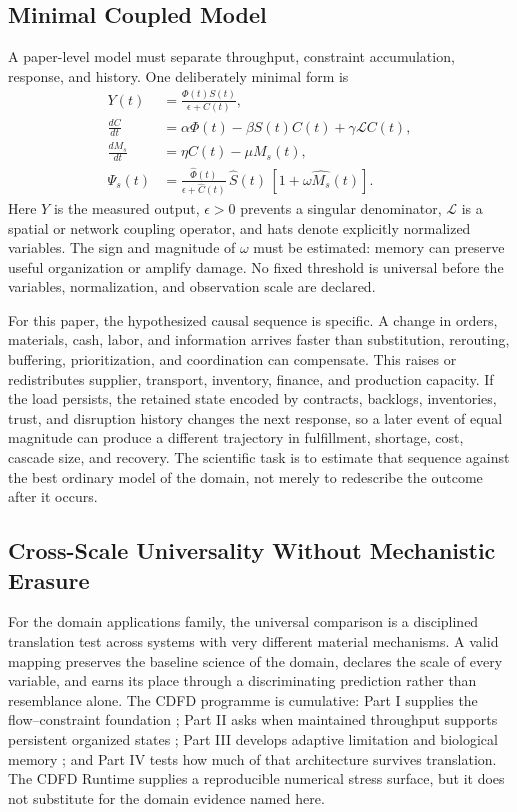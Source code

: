 \documentclass[11pt]{article}
\begin{document}
\subsection{Minimal Coupled Model}

A paper-level model must separate throughput, constraint accumulation, response,
and history. One deliberately minimal form is
\begin{align}
Y(t) &= \frac{\Phi(t)S(t)}{\epsilon + C(t)}, \\
\frac{dC}{dt} &= \alpha \Phi(t) - \beta S(t)C(t) + \gamma \mathcal{L}C(t), \\
\frac{dM_s}{dt} &= \eta C(t) - \mu M_s(t), \\
\Psi_s(t) &= \frac{\widehat{\Phi}(t)}{\epsilon+\widehat{C}(t)}\,
             \widehat{S}(t)\,[1+\omega\widehat{M_s}(t)] .
\end{align}
Here $Y$ is the measured output, $\epsilon>0$ prevents a singular denominator,
$\mathcal{L}$ is a spatial or network coupling operator, and hats denote
explicitly normalized variables. The sign and magnitude of $\omega$ must be
estimated: memory can preserve useful organization or amplify damage. No fixed
threshold is universal before the variables, normalization, and observation
scale are declared.

For this paper, the hypothesized causal sequence is specific. A change in
orders, materials, cash, labor, and information arrives faster than substitution, rerouting, buffering, prioritization, and coordination can compensate.
This raises or redistributes supplier, transport, inventory, finance, and production capacity. If the load persists,
the retained state encoded by contracts, backlogs, inventories, trust, and disruption history changes the next response, so a later event of equal
magnitude can produce a different trajectory in fulfillment, shortage, cost, cascade size, and recovery. The
scientific task is to estimate that sequence against the best ordinary model of
the domain, not merely to redescribe the outcome after it occurs.

\subsection{Cross-Scale Universality Without Mechanistic Erasure}

For the domain applications family, the universal comparison is a disciplined translation test across systems with very different material mechanisms. A valid mapping preserves the baseline science of the domain, declares the scale of every variable, and earns its place through a discriminating prediction rather than resemblance alone. \cite{Holling1973,Turing1952,Shannon1948,BakTangWiesenfeld1987}
The CDFD programme is cumulative: Part I supplies the flow--constraint
foundation \cite{MujjabiPartI2026}; Part II asks when maintained throughput
supports persistent organized states \cite{MujjabiPartII2026}; Part III
develops adaptive limitation and biological memory \cite{MujjabiPartIII2026};
and Part IV \cite{MujjabiPartIV2026} tests how much of that architecture
survives translation. The CDFD Runtime \cite{CDFDRuntime2026} supplies a
reproducible numerical stress surface, but it does not substitute for the
domain evidence named here.
\end{document}

